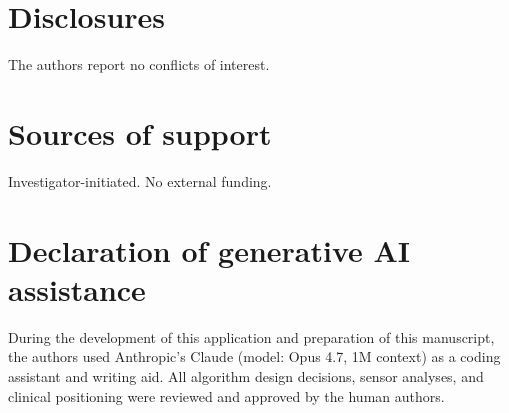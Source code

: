 \documentclass[3p,times]{elsarticle}
\begin{document}
\section*{Disclosures}

The authors report no conflicts of interest.

\section*{Sources of support}

Investigator-initiated. No external funding.

\section*{Declaration of generative AI assistance}

During the development of this application and preparation of this
manuscript, the authors used Anthropic's Claude (model: Opus 4.7,
1M context) as a coding assistant and writing aid. All algorithm
design decisions, sensor analyses, and clinical positioning were
reviewed and approved by the human authors.



\end{document}
